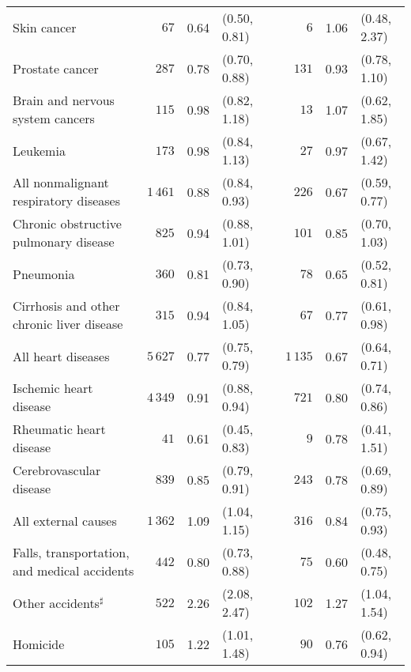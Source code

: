 \documentclass[]{article}
\begin{document}
\begin{table}[H]
\begin{tabular}{lrrlcrrl}
  \hspace{10pt}Skin cancer & $67$ & 0.64 &  (0.50, 0.81) &  & $6$ & 1.06 &  (0.48, 2.37) \\ 
  \hspace{10pt}Prostate cancer & $287$ & 0.78 &  (0.70, 0.88) &  & $131$ & 0.93 &  (0.78, 1.10) \\ 
  \hspace{10pt}Brain and nervous system cancers & $115$ & 0.98 &  (0.82, 1.18) &  & $13$ & 1.07 &  (0.62, 1.85) \\ 
  Leukemia & $173$ & 0.98 &  (0.84, 1.13) &  & $27$ & 0.97 &  (0.67, 1.42) \\ 
  \hspace{10pt}All nonmalignant respiratory diseases & $1\,461$ & 0.88 &  (0.84, 0.93) &  & $226$ & 0.67 &  (0.59, 0.77) \\ 
  \hspace{10pt}Chronic obstructive pulmonary disease & $825$ & 0.94 &  (0.88, 1.01) &  & $101$ & 0.85 &  (0.70, 1.03) \\ 
  Pneumonia & $360$ & 0.81 &  (0.73, 0.90) &  & $78$ & 0.65 &  (0.52, 0.81) \\ 
  Cirrhosis and other chronic liver disease & $315$ & 0.94 &  (0.84, 1.05) &  & $67$ & 0.77 &  (0.61, 0.98) \\ 
  \hspace{10pt}All heart diseases & $5\,627$ & 0.77 &  (0.75, 0.79) &  & $1\,135$ & 0.67 &  (0.64, 0.71) \\ 
  \hspace{10pt}Ischemic heart disease & $4\,349$ & 0.91 &  (0.88, 0.94) &  & $721$ & 0.80 &  (0.74, 0.86) \\ 
  Rheumatic heart disease & $41$ & 0.61 &  (0.45, 0.83) &  & $9$ & 0.78 &  (0.41, 1.51) \\ 
  Cerebrovascular disease & $839$ & 0.85 &  (0.79, 0.91) &  & $243$ & 0.78 &  (0.69, 0.89) \\ 
  \hspace{10pt}All external causes & $1\,362$ & 1.09 &  (1.04, 1.15) &  & $316$ & 0.84 &  (0.75, 0.93) \\ 
  \hspace{10pt}Falls, transportation, and medical accidents & $442$ & 0.80 &  (0.73, 0.88) &  & $75$ & 0.60 &  (0.48, 0.75) \\ 
  \hspace{10pt}Other accidents$^\sharp$ & $522$ & 2.26 &  (2.08, 2.47) &  & $102$ & 1.27 &  (1.04, 1.54) \\ 
  \hspace{10pt}Homicide & $105$ & 1.22 &  (1.01, 1.48) &  & $90$ & 0.76 &  (0.62, 0.94) \\ 

\end{tabular}
\end{table}
\end{document}
